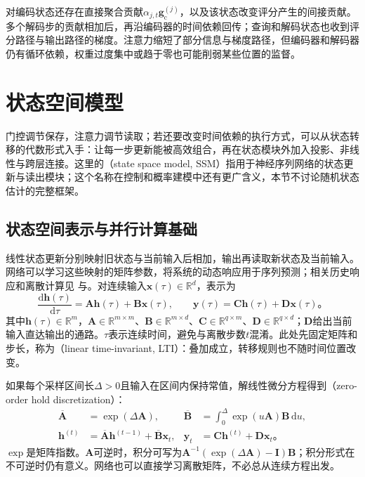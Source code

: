 对编码状态还存在直接聚合贡献$\alpha_{j,t}\bm{g}_{\mathrm{c}}^{(j)}$，以及该状态改变评分产生的间接贡献。多个解码步的贡献相加后，再沿编码器的时间依赖回传；查询和解码状态也收到评分路径与输出路径的梯度。注意力缩短了部分信息与梯度路径，但编码器和解码器仍有循环依赖，权重过度集中或趋于零也可能削弱某些位置的监督。

\section{状态空间模型}
\label{sec:rnn-state-space}

门控调节保存，注意力调节读取；若还要改变时间依赖的执行方式，可以从状态转移的代数形式入手：让每一步更新能被高效组合，再在状态模块外加入投影、非线性与跨层连接。这里的（state space model, SSM）指用于神经序列网络的状态更新与读出模块；这个名称在控制和概率建模中还有更广含义，本节不讨论随机状态估计的完整框架。

\subsection{状态空间表示与并行计算基础}
\label{sec:rnn-ssm-foundations}

线性状态更新分别映射旧状态与当前输入后相加，输出再读取新状态及当前输入。网络可以学习这些映射的矩阵参数，将系统的动态响应用于序列预测；相关历史响应和离散计算见
与。对连续输入$\bm{x}(\tau)\in\mathbb{R}^{d}$，表示为
\begin{equation}
  \frac{\mathrm{d}\bm{h}(\tau)}{\mathrm{d}\tau}
    =\bm{A}\bm{h}(\tau)+\bm{B}\bm{x}(\tau),
  \qquad
  \bm{y}(\tau)=\bm{C}\bm{h}(\tau)+\bm{D}\bm{x}(\tau)\text{。}
  \label{eq:rnn-continuous-ssm}
\end{equation}
其中$\bm{h}(\tau)\in\mathbb{R}^{m}$，$\bm{A}\in\mathbb{R}^{m\times m}$、$\bm{B}\in\mathbb{R}^{m\times d}$、$\bm{C}\in\mathbb{R}^{q\times m}$、$\bm{D}\in\mathbb{R}^{q\times d}$；$\bm{D}$给出当前输入直达输出的通路。$\tau$表示连续时间，避免与离散步数$t$混淆。此处先固定矩阵和步长，称为（linear time-invariant, LTI）：叠加成立，转移规则也不随时间位置改变。

如果每个采样区间长$\Delta>0$且输入在区间内保持常值，解线性微分方程得到（zero-order hold discretization）：
\begin{equation}
  \begin{aligned}
    \overline{\bm{A}}&=\exp(\Delta\bm{A}),
    &\overline{\bm{B}}&=\int_0^{\Delta}\exp(u\bm{A})\bm{B}\,\mathrm{d}u,\\
    \bm{h}^{(t)}&=\overline{\bm{A}}\bm{h}^{(t-1)}
       +\overline{\bm{B}}\bm{x}_t,
    &\bm{y}_t&=\bm{C}\bm{h}^{(t)}+\bm{D}\bm{x}_t\text{。}
  \end{aligned}
  \label{eq:rnn-ssm-zoh}
\end{equation}
$\exp$是矩阵指数。$\bm{A}$可逆时，积分可写为$\bm{A}^{-1}(\exp(\Delta\bm{A})-\bm{I})\bm{B}$；积分形式在不可逆时仍有意义。网络也可以直接学习离散矩阵，不必总从连续方程出发。

